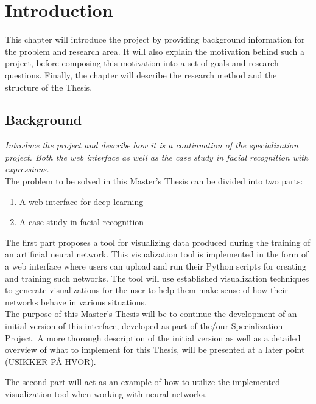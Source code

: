 
\chapter{Introduction}

This chapter will introduce the project by providing background information for the problem and research area. It will also explain the motivation behind such a project, before composing this motivation into a set of goals and research questions. Finally, the chapter will describe the research method and the structure of the Thesis.

\section{Background}

\textit{Introduce the project and describe how it is a continuation of the specialization project. Both the web interface as well as the case study in facial recognition with expressions.} \\

\noindent The problem to be solved in this Master's Thesis can be divided into two parts:
\begin{enumerate}
    \item A web interface for deep learning
    \item A case study in facial recognition
\end{enumerate}

\noindent The first part proposes a tool for visualizing data produced during the training of an artificial neural network. This visualization tool is implemented in the form of a web interface where users can upload and run their Python scripts for creating and training such networks. The tool will use established visualization techniques to generate visualizations for the user to help them make sense of how their networks behave in various situations. \\

\noindent The purpose of this Master's Thesis will be to continue the development of an initial version of this interface, developed as part of the/our Specialization Project. A more thorough description of the initial version as well as a detailed overview of what to implement for this Thesis, will be presented at a later point (USIKKER PÅ HVOR).

\noindent The second part will act as an example of how to utilize the implemented visualization tool when working with neural networks.

